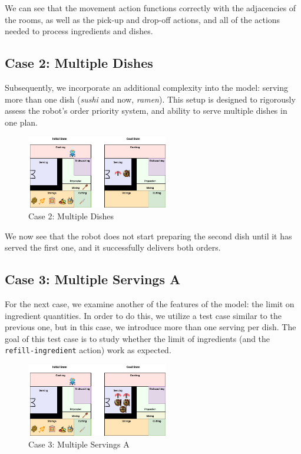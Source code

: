 \documentclass{article}
\begin{document}
We can see that the movement action functions correctly with the adjacencies of the rooms, as well as the pick-up and drop-off actions, and all of the actions needed to process ingredients and dishes.

\subsection{Case 2: Multiple Dishes}

Subsequently, we incorporate an additional complexity into the model: serving more than one dish (\textit{sushi} and now, \textit{ramen}). This setup is designed to rigorously assess the robot's order priority system, and ability to serve multiple dishes in one plan.

\begin{figure}[H]
    \centering
    \includegraphics[width=0.55\textwidth]{illustrations/problem-2-multiple-dishes.drawio.png}
    \caption{Case 2: Multiple Dishes}
    \label{fig:initial-state-dishes}
\end{figure}
\FloatBarrier

We now see that the robot does not start preparing the second dish until it has served the first one, and it successfully delivers both orders.

\subsection{Case 3: Multiple Servings A}

For the next case, we examine another of the features of the model: the limit on ingredient quantities. In order to do this, we utilize a test case similar to the previous one, but in this case, we introduce more than one serving per dish. The goal of this test case is to study whether the limit of ingredients (and the \texttt{refill-ingredient} action) work as expected.

\begin{figure}[H]
    \centering
    \includegraphics[width=0.55\textwidth]{illustrations/problem-3-multiple-serving.drawio.png}
    \caption{Case 3: Multiple Servings A}
    \label{fig:initial-state-servingsA}
\end{figure}
\FloatBarrier
\end{document}
